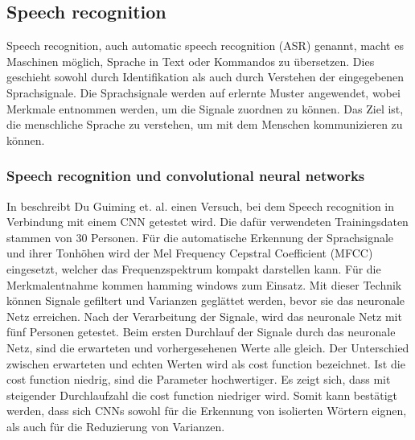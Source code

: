\subsection{Speech recognition}
Speech recognition, auch automatic speech recognition (ASR) genannt, macht es Maschinen möglich, Sprache in Text oder Kommandos zu übersetzen. Dies geschieht sowohl durch Identifikation als auch durch Verstehen der eingegebenen Sprachsignale. Die Sprachsignale werden auf erlernte Muster angewendet, wobei Merkmale entnommen werden, um die Signale zuordnen zu können. Das Ziel ist, die menschliche Sprache zu verstehen, um mit dem Menschen kommunizieren zu können.\cite{technology}\\

\subsubsection{Speech recognition und convolutional neural networks}
In \cite{usingcnn} beschreibt Du Guiming et. al. einen Versuch, bei dem Speech recognition in Verbindung mit einem CNN getestet wird. Die dafür verwendeten Trainingsdaten stammen von 30 Personen. Für die automatische Erkennung der Sprachsignale und ihrer Tonhöhen wird der Mel Frequency Cepstral Coefficient (MFCC) \cite{MFCC} eingesetzt, welcher das Frequenzspektrum kompakt darstellen kann. Für die Merkmalentnahme kommen hamming windows zum Einsatz. Mit dieser Technik können Signale gefiltert und Varianzen geglättet werden, bevor sie das neuronale Netz erreichen. Nach der Verarbeitung der Signale, wird das neuronale Netz mit fünf Personen getestet. Beim ersten Durchlauf der Signale durch das neuronale Netz, sind die erwarteten und vorhergesehenen Werte alle gleich. Der Unterschied zwischen erwarteten und echten Werten wird als cost function bezeichnet. Ist die cost function niedrig, sind die Parameter hochwertiger. Es zeigt sich, dass mit steigender Durchlaufzahl die cost function niedriger wird. Somit kann bestätigt werden, dass sich CNNs sowohl für die Erkennung von isolierten Wörtern eignen, als auch für die Reduzierung von Varianzen.\cite{usingcnn}\\
\\
